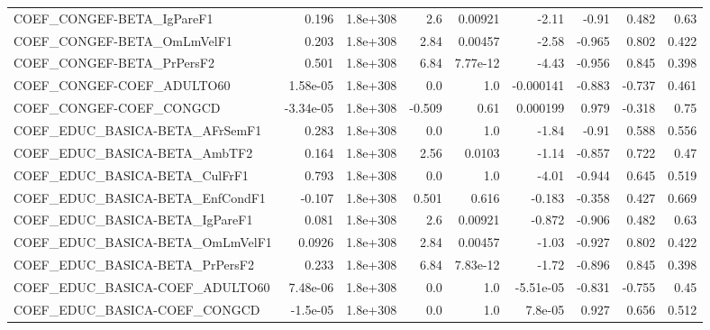\begin{tabular}{lrrrrrrrr}
COEF\_CONGEF-BETA\_IgPareF1             &       0.196 &     1.8e+308 &     2.6 &  0.00921 &      -2.11 &       -0.91 &        0.482 &          0.63 \\
COEF\_CONGEF-BETA\_OmLmVelF1            &       0.203 &     1.8e+308 &    2.84 &  0.00457 &      -2.58 &      -0.965 &        0.802 &         0.422 \\
COEF\_CONGEF-BETA\_PrPersF2             &       0.501 &     1.8e+308 &    6.84 & 7.77e-12 &      -4.43 &      -0.956 &        0.845 &         0.398 \\
COEF\_CONGEF-COEF\_ADULTO60             &    1.58e-05 &     1.8e+308 &     0.0 &      1.0 &  -0.000141 &      -0.883 &       -0.737 &         0.461 \\
COEF\_CONGEF-COEF\_CONGCD               &   -3.34e-05 &     1.8e+308 &  -0.509 &     0.61 &   0.000199 &       0.979 &       -0.318 &          0.75 \\
COEF\_EDUC\_BASICA-BETA\_AFrSemF1        &       0.283 &     1.8e+308 &     0.0 &      1.0 &      -1.84 &       -0.91 &        0.588 &         0.556 \\
COEF\_EDUC\_BASICA-BETA\_AmbTF2          &       0.164 &     1.8e+308 &    2.56 &   0.0103 &      -1.14 &      -0.857 &        0.722 &          0.47 \\
COEF\_EDUC\_BASICA-BETA\_CulFrF1         &       0.793 &     1.8e+308 &     0.0 &      1.0 &      -4.01 &      -0.944 &        0.645 &         0.519 \\
COEF\_EDUC\_BASICA-BETA\_EnfCondF1       &      -0.107 &     1.8e+308 &   0.501 &    0.616 &     -0.183 &      -0.358 &        0.427 &         0.669 \\
COEF\_EDUC\_BASICA-BETA\_IgPareF1        &       0.081 &     1.8e+308 &     2.6 &  0.00921 &     -0.872 &      -0.906 &        0.482 &          0.63 \\
COEF\_EDUC\_BASICA-BETA\_OmLmVelF1       &      0.0926 &     1.8e+308 &    2.84 &  0.00457 &      -1.03 &      -0.927 &        0.802 &         0.422 \\
COEF\_EDUC\_BASICA-BETA\_PrPersF2        &       0.233 &     1.8e+308 &    6.84 & 7.83e-12 &      -1.72 &      -0.896 &        0.845 &         0.398 \\
COEF\_EDUC\_BASICA-COEF\_ADULTO60        &    7.48e-06 &     1.8e+308 &     0.0 &      1.0 &  -5.51e-05 &      -0.831 &       -0.755 &          0.45 \\
COEF\_EDUC\_BASICA-COEF\_CONGCD          &    -1.5e-05 &     1.8e+308 &     0.0 &      1.0 &    7.8e-05 &       0.927 &        0.656 &         0.512 \\

\end{tabular}
